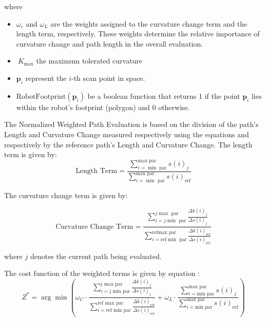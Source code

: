 where \begin{itemize}
    \item \(\omega_c\) and \(\omega_L\) are the weights assigned to the curvature change term and the length term, 
    respectively. These weights determine the relative importance of curvature change and path length in the overall 
    evaluation. 
    \item \(\ K_{\max}\) the maximum tolerated curvature
    \item \( \mathbf{p}_i \) represent the \( i \)-th scan point in space. 

    \item \( \text{RobotFootprint}(\mathbf{p}_i) \) be a boolean function that returns 1 if the point \( \mathbf{p}_i \) 
    lies within the robot's footprint (polygon) and 0 otherwise.
    
\end{itemize}



The Normalized Weighted Path Evaluation is based on the division of the path's Length
and Curvature Change measured respectively using the equations  and 
 respectively by the reference path's Length and Curvature Change. 
The length term is given by:
\begin{equation}
    \text{Length Term} = \frac{\sum_{i=\min \text{ par}}^{\max \text{ par}} s(i)_j}{\sum_{i=\min \text{ par}}^{\max \text{ par}} s(i)_{\text{ref}}}
\end{equation}

\noindent
The curvature change term is given by:

\begin{equation}
    \text{Curvature Change Term} = \frac{\sum_{i=j \min \text{ par}}^{j \max \text{ par}} \frac{\Delta k(i)_j}{\Delta s(i)_j}}{\sum_{i=\text{ref} \min \text{ par}}^{\text{ref} \max \text{ par}} \frac{\Delta k(i)_{\text{ref}}}{\Delta s(i)_{\text{ref}}}}
\end{equation}

where \( j \) denotes the current path being evaluated.

\noindent The cost function of the weighted terms is given by equation :
\begin{equation}
    Z^{\ast} = \arg \min \left( \omega_C \cdot \frac{\sum_{i=\text{j min par}}^{\text{j max par}} \frac{\Delta k(i)_j}
    {\Delta s(i)_j}}{\sum_{i=\text{ref min par}}^{\text{ref max par}} \frac{\Delta k(i)_{\text{ref}}}
    {\Delta s(i)_{\text{ref}}} } + \omega_L \cdot \frac{\sum_{i=\text{min par}}^{\text{max par}} s(i)_j}
    {\sum_{i=\text{min par}}^{\text{max par}} s(i)_{\text{ref}}} \right)
\label{Norm_function}
\end{equation}

